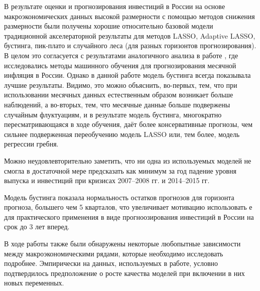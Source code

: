 В результате оценки и прогнозирования инвестиций в России на основе макроэкономических данных высокой размерности с помощью методов снижения размерности были получены хорошие относительно базовой модели традиционной акселераторной результаты для методов LASSO, Adaptive LASSO, бустинга, пик-плато и случайного леса (для разных горизонтов прогнозирования). В целом это согласуется с результатами аналогичного анализа в работе \cite{baybuza2018inflation}, где исследовались методы машинного обучения для прогнозирования месячной инфляция в России. Однако в данной работе модель бустинга всегда показывала лучшие результаты. Видимо, это можно объяснить, во-первых, тем, что при использовании месячных данных естественным образом возникает больше наблюдений, а во-вторых, тем, что месячные данные больше подвержены случайным флуктуациям, и в результате модель бустинга, многократно пересматривающаяся в ходе обучения, даёт более консервативные прогнозы, чем сильнее подверженная переобучению модель LASSO или, тем более, модель регрессии гребня.

Можно неудовлевторительно заметить, что ни одна из используемых моделей не смогла в достаточной мере предсказать как минимум за год падение уровня выпуска и инвестиций при кризисах 2007--2008 гг. и 2014--2015 гг.

Модель бустинга показала нормальность остатков прогнозов для горизонта прогноза, большего чем 5 кварталов, что увеличивает мотивацию использовать е для практического применения в виде прогноозирования инвестиций в России на срок до 3 лет вперед. 

В ходе работы также были обнаружены некоторые любопытные зависимости между макроэкономическими рядами, которые необходимо исследовать подробнее. 
Эмпирически на данных, используемых в работе, условно подтвердилось предположение о росте качества моделей при включении в них новых переменных.

\newpage
\label{ch:final}


\printbibliography

\newpage

